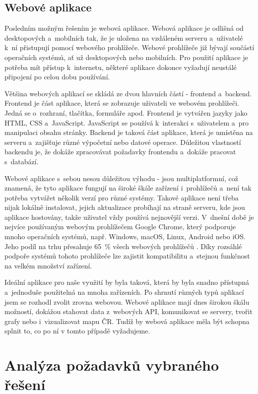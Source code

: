 \subsection{Webové aplikace}

Posledním možným řešením je webová aplikace. Webová aplikace je odlišná od desktopových a~mobilních tak, že je uložena na vzdáleném serveru a~uživatelé k~ní přistupují pomocí webového prohlížeče. Webové prohlížeče již bývají součástí operačních systémů, ať už desktopových nebo mobilních. Pro použití aplikace je potřeba mít přístup k~internetu, některé aplikace dokonce vyžadují neustálé připojení po celou dobu používání. 

Většina webových aplikací se skládá ze dvou hlavních částí - frontend a~backend. Frontend je část aplikace, která se zobrazuje uživateli ve webovém prohlížeči. Jedná se o~rozhraní, tlačítka, formuláře apod. Frontend je vytvářen jazyky jako HTML, CSS a~JavaScript. JavaScript se používá k~interakci s~uživatelem a~pro manipulaci obsahu stránky. Backend je taková část aplikace, která je umístěna na serveru a~zajišťuje různé výpočetní nebo datové operace. Důležitou vlastností backendu je, že dokáže zpracovávat požadavky frontendu a~dokáže pracovat s~databází.

Webové aplikace s~sebou nesou důležitou výhodu - jsou multiplatformní, což znamená, že tyto aplikace fungují na široké škále zařízení i~prohlížečů a~není tak potřeba vytvářet několik verzí pro různé systémy. Takové aplikace není třeba nijak lokálně instalovat, jejich aktualizace probíhají na straně serveru, kde jsou aplikace hostovány, takže uživatel vždy používá nejnovější verzi. V~dnešní době je nejvíce používaným webovým prohlížečem Google Chrome, který podporuje mnoho operačních systémů, např. Windows, macOS, Linux, Android nebo iOS. Jeho podíl na trhu přesahuje 65~\% všech webových prohlížečů \cite{marketshare-browser}. Díky rozsáhlé podpoře systémů tohoto prohlížeče lze zajistit kompatibilitu a~stejnou funkčnost na velkém množství zařízení.

Ideální aplikace pro naše využití by byla taková, která by byla snadno přístupná a~jednoduše použitelná na mnoha zařízeních. Po shrnutí různých typů aplikací jsem se rozhodl zvolit zrovna webovou. Webové aplikace mají dnes širokou škálu možností, dokážou stahovat data z~webových API, komunikovat se servery, tvořit grafy nebo i~vizualizovat mapu ČR. Tudíž by webová aplikace měla být schopna splnit to, co po ní v tomto případě vyžadujeme.

\section{Analýza požadavků vybraného řešení}

